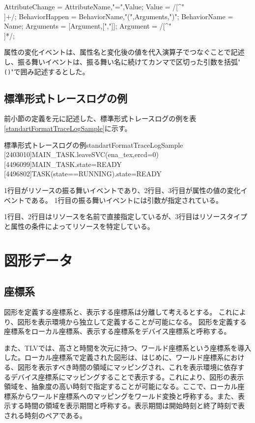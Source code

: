 \begin{EBNF}
AttributeChange = AttributeName,"=",Value;
Value = /[^"\\]+/;
BehaviorHappen =  BehaviorName,"(",Arguments,")";
BehaviorName = Name;
Arguments = [{Argument,[","]}];
Argument = /[^"\\]*/;
\end{EBNF}

属性の変化イベントは、属性名と変化後の値を代入演算子でつなぐことで記述し、振る舞いイベントは、振る舞い名に続けてカンマで区切った引数を括弧"{\tt ()}"で囲み記述するとした。


\subsection{標準形式トレースログの例}

前小節の定義を元に記述した、標準形式トレースログの例を表\ref{standartFormatTraceLogSample}に示す。

\begin{File}{標準形式トレースログの例}{standartFormatTraceLogSample}
[2403010]MAIN_TASK.leaveSVC(ena_tex,ercd=0)
[4496099]MAIN_TASK.state=READY
[4496802]TASK(state==RUNNING).state=READY
\end{File}

1行目がリソースの振る舞いイベントであり、2行目、3行目が属性の値の変化イベントである。
1行目の振る舞いイベントには引数が指定されている。

1行目、2行目はリソースを名前で直接指定しているが、3行目はリソースタイプと属性の条件によってリソースを特定している。

\section{図形データ}\label{subsec:visualization}
\subsection{座標系}

図形を定義する座標系と、表示する座標系は分離して考えるとする。
これにより、図形を表示環境から独立して定義することが可能になる。
図形を定義する座標系をローカル座標系、表示する座標系をデバイス座標系と呼称する。

また、TLVでは、高さと時間を次元に持つ、ワールド座標系という座標系を導入
した。ローカル座標系で定義された図形は、はじめに、ワールド座標系におけ
る、図形を表示すべき時間の領域にマッピングされ、これを表示環境に依存す
るデバイス座標系にマッピングすることで表示する。これにより、図形の表示
領域を、抽象度の高い時刻で指定することが可能になる。ここで、ローカル座
標系からワールド座標系へのマッピングをワールド変換と呼称する。また、表
示する時間の領域を表示期間と呼称する。表示期間は開始時刻と終了時刻で表
される時刻のペアである。

